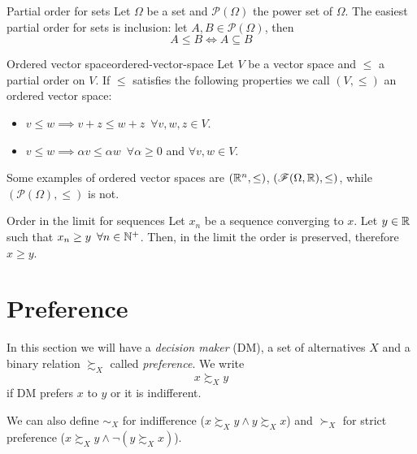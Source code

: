 \documentclass[12pt]{extarticle}
\begin{document}
\begin{example}{Partial order for sets}{}
    Let $\Omega$ be a set and $\mathcal P(\Omega)$ the power set of $\Omega$.
    The easiest partial order for sets is inclusion:
    let $A, B \in \mathcal P(\Omega)$, then
    \begin{equation}
        A \leq B \iff A \subseteq B
    \end{equation}
\end{example}

\begin{definition}{Ordered vector space}{ordered-vector-space}
    Let $V$ be a vector space and $\leq$ a partial order on $V$.
    If $\leq$ satisfies the following properties we call $(V, \leq)$ an ordered vector space:
    \begin{itemize}
        \item $v \leq w \implies v + z \leq w + z \enspace \forall v, w, z \in V$.
        \item $v \leq w \implies \alpha v \leq \alpha w \enspace \forall \alpha \geq 0$ and $\forall v, w \in V$.
    \end{itemize}
\end{definition}

Some examples of ordered vector spaces are $(\mathbb{R}^n, \leq)$, $(\mathscr F(\Omega, \mathbb{R}), \leq)$, while $(\mathcal P(\Omega), \leq)$ is not.

\begin{remark}{Order in the limit for sequences}{}
    Let $x_n$ be a sequence converging to $x$.
    Let $y \in \mathbb{R}$ such that $x_n \geq y \enspace \forall n \in \mathbb{N}^+$.
    Then, in the limit the order is preserved, therefore $x \geq y$.
\end{remark}

\section{Preference}

In this section we will have a \emph{decision maker} (DM), a set of alternatives $X$ and a binary relation $\succsim_X$ called \emph{preference}.
We write
\begin{equation}
    x \succsim_X y
\end{equation}
if DM prefers $x$ to $y$ or it is indifferent.

We can also define $\sim_X$ for indifference ($x \succsim_X y \land y \succsim_X x$) and $\succ_X$ for strict preference ($x \succsim_X y \land \lnot (y \succsim_X x)$).
\end{document}

